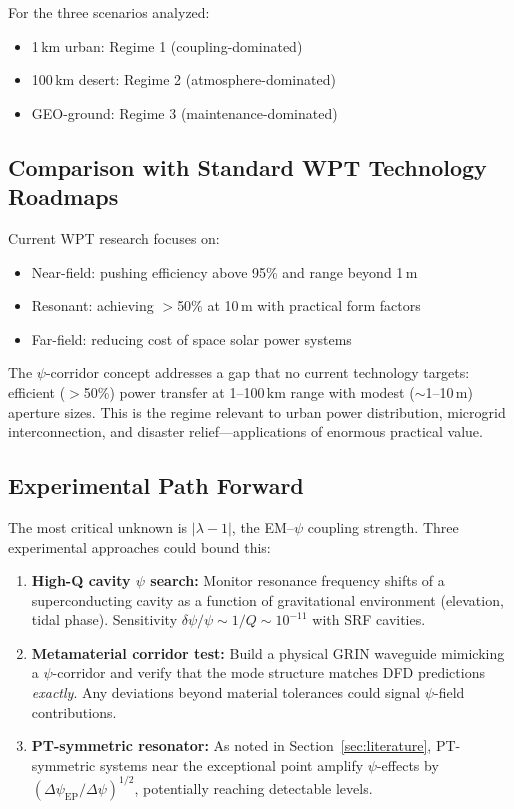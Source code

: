 \documentclass[journal,twocolumn]{IEEEtran}
\begin{document}
For the three scenarios analyzed:
\begin{itemize}
\item 1\,km urban: Regime 1 (coupling-dominated)
\item 100\,km desert: Regime 2 (atmosphere-dominated)
\item GEO-ground: Regime 3 (maintenance-dominated)
\end{itemize}

\subsection{Comparison with Standard WPT Technology Roadmaps}

Current WPT research focuses on:
\begin{itemize}
\item Near-field: pushing efficiency above 95\% and range beyond 1\,m
\item Resonant: achieving $>$50\% at 10\,m with practical form factors
\item Far-field: reducing cost of space solar power systems
\end{itemize}

The $\psi$-corridor concept addresses a gap that no current technology
targets: efficient ($>$50\%) power transfer at 1--100\,km range with
modest ($\sim$1--10\,m) aperture sizes. This is the regime relevant
to urban power distribution, microgrid interconnection, and disaster
relief---applications of enormous practical value.

\subsection{Experimental Path Forward}

The most critical unknown is $|\lambda - 1|$, the EM--$\psi$ coupling
strength. Three experimental approaches could bound this:

\begin{enumerate}
\item \textbf{High-Q cavity $\psi$ search:} Monitor resonance
frequency shifts of a superconducting cavity as a function of
gravitational environment (elevation, tidal phase). Sensitivity
$\delta\psi/\psi \sim 1/Q \sim 10^{-11}$ with SRF cavities.

\item \textbf{Metamaterial corridor test:} Build a physical GRIN
waveguide mimicking a $\psi$-corridor and verify that the mode
structure matches DFD predictions \emph{exactly}. Any deviations
beyond material tolerances could signal $\psi$-field contributions.

\item \textbf{PT-symmetric resonator:} As noted in Section~\ref{sec:literature},
PT-symmetric systems near the exceptional point amplify $\psi$-effects
by $(\Delta\psi_\text{EP}/\Delta\psi)^{1/2}$, potentially reaching
detectable levels.
\end{enumerate}
\end{document}

